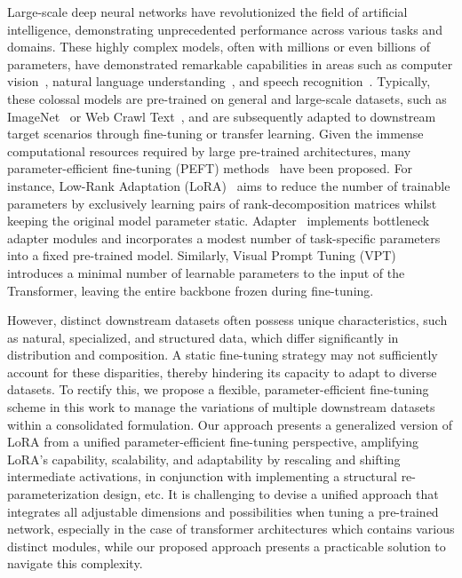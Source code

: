 Large-scale deep neural networks have revolutionized the field of artificial intelligence, demonstrating unprecedented performance across various tasks and domains. These highly complex models, often with millions or even billions of parameters, have demonstrated remarkable capabilities in areas such as computer vision~\citep{dosovitskiyimage}, natural language understanding~\citep{vaswani2017attention}, and speech recognition~\citep{radford2022robust}. Typically, these colossal models are pre-trained on general and large-scale datasets, such as ImageNet~\citep{5206848} or Web Crawl Text~\citep{wenzek2019ccnet}, and are subsequently adapted to downstream target scenarios through fine-tuning or transfer learning. Given the immense computational resources required by large pre-trained architectures, many parameter-efficient fine-tuning (PEFT) methods~\citep{hu2021lora,shen2021partial,jia2022visual,zhang2022neural,luo2023towards} have been proposed. For instance, Low-Rank Adaptation (LoRA)~\citep{hu2021lora} aims to reduce the number of trainable parameters by exclusively learning pairs of rank-decomposition matrices whilst keeping the original model parameter static. Adapter~\citep{houlsby2019parameter} implements bottleneck adapter modules and incorporates a modest number of task-specific parameters into a fixed pre-trained model. Similarly, Visual Prompt Tuning (VPT)~\citep{jia2022visual} introduces a minimal number of learnable parameters to the input of the Transformer, leaving the entire backbone frozen during fine-tuning.

However, distinct downstream datasets often possess unique characteristics, such as natural, specialized, and structured data, which differ significantly in distribution and composition. A static fine-tuning strategy may not sufficiently account for these disparities, thereby hindering its capacity to adapt to diverse datasets. To rectify this, we propose a flexible, parameter-efficient fine-tuning scheme in this work to manage the variations of multiple downstream datasets within a consolidated formulation. Our approach presents a generalized version of LoRA from a unified parameter-efficient fine-tuning perspective, amplifying LoRA's capability, scalability, and adaptability by rescaling and shifting intermediate activations, in conjunction with implementing a structural re-parameterization design, etc. It is challenging to devise a unified approach that integrates all adjustable dimensions and possibilities when tuning a pre-trained network, especially in the case of transformer architectures which contains various distinct modules, while our proposed approach presents a practicable solution to navigate this complexity.

